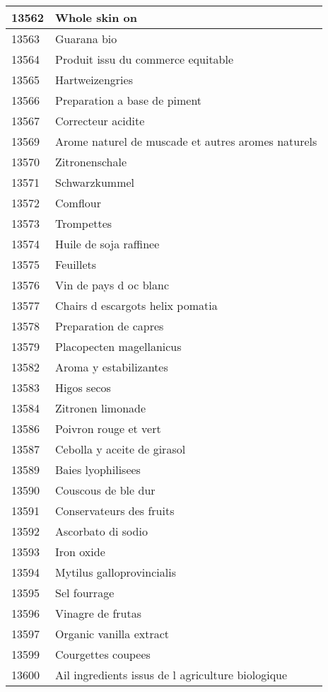 \begin{longtable}{|l|l|}
13562 & Whole skin on \\ \hline 
13563 & Guarana bio \\ \hline 
13564 & Produit issu du commerce equitable \\ \hline 
13565 & Hartweizengries \\ \hline 
13566 & Preparation a base de piment \\ \hline 
13567 & Correcteur acidite \\ \hline 
13569 & Arome naturel de muscade et autres aromes naturels \\ \hline 
13570 & Zitronenschale \\ \hline 
13571 & Schwarzkummel \\ \hline 
13572 & Comflour \\ \hline 
13573 & Trompettes \\ \hline 
13574 & Huile de soja raffinee \\ \hline 
13575 & Feuillets \\ \hline 
13576 & Vin de pays d oc blanc \\ \hline 
13577 & Chairs d escargots helix pomatia \\ \hline 
13578 & Preparation de capres \\ \hline 
13579 & Placopecten magellanicus \\ \hline 
13582 & Aroma y estabilizantes \\ \hline 
13583 & Higos secos \\ \hline 
13584 & Zitronen limonade \\ \hline 
13586 & Poivron rouge et vert \\ \hline 
13587 & Cebolla y aceite de girasol \\ \hline 
13589 & Baies lyophilisees \\ \hline 
13590 & Couscous de ble dur \\ \hline 
13591 & Conservateurs des fruits \\ \hline 
13592 & Ascorbato di sodio \\ \hline 
13593 & Iron oxide \\ \hline 
13594 & Mytilus galloprovincialis \\ \hline 
13595 & Sel fourrage \\ \hline 
13596 & Vinagre de frutas \\ \hline 
13597 & Organic vanilla extract \\ \hline 
13599 & Courgettes coupees \\ \hline 
13600 & Ail ingredients issus de l agriculture biologique \\ \hline 

\end{longtable}
